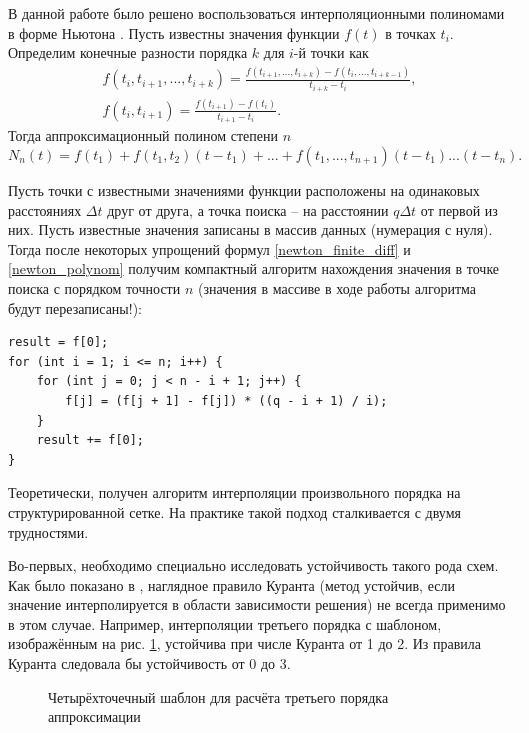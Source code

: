 В данной работе было решено воспользоваться интерполяционными полиномами в форме Ньютона \cite{petrov_lobanov}. Пусть известны значения функции $f(t)$ в точках $t_i$.
Определим конечные разности порядка $k$ для $i$-й точки как 
\begin{eqnarray}
\label{newton_finite_diff}
f(t_i, t_{i+1}, ..., t_{i+k}) = \frac{f(t_{i+1}, ..., t_{i+k}) - f(t_i, ..., t_{i+k-1})}{t_{i+k} - t_{i}}, \\
f(t_i, t_{i+1}) = \frac{f(t_{i+1}) - f(t_i)}{t_{i+1} - t_i}.
\end{eqnarray}
Тогда аппроксимационный полином степени $n$
\begin{equation}
\label{newton_polynom}
N_n(t) = f(t_1) + f(t_1, t_2)(t-t_1) + ... + f(t_1, ..., t_{n+1})(t-t_1)...(t-t_n).
\end{equation}

Пусть точки с известными значениями функции расположены на одинаковых расстояниях $\Delta t$ друг от друга, а точка поиска -- на расстоянии $q \Delta t$ от первой из них. Пусть известные значения записаны в массив данных (нумерация с нуля). Тогда после некоторых упрощений формул \eqref{newton_finite_diff} и \eqref{newton_polynom} получим компактный алгоритм нахождения значения в точке поиска с порядком точности $n$ (значения в массиве в ходе работы алгоритма будут перезаписаны!):


\begin{lstlisting}
result = f[0];
for (int i = 1; i <= n; i++) {
	for (int j = 0; j < n - i + 1; j++) {
		f[j] = (f[j + 1] - f[j]) * ((q - i + 1) / i);
	}
	result += f[0];
}
\end{lstlisting}
Теоретически, получен алгоритм интерполяции произвольного порядка на структурированной сетке. На практике такой подход сталкивается с двумя трудностями. 

Во-первых, необходимо специально исследовать устойчивость такого рода схем. Как было показано в \cite{favorskaya_disser}, наглядное правило Куранта (метод устойчив, если значение интерполируется в области зависимости решения) не всегда применимо в этом случае. Например, интерполяции третьего порядка с шаблоном, изображённым на рис. \ref{pic:stability}, устойчива при числе Куранта от 1 до 2. Из правила Куранта следовала бы устойчивость от 0 до 3.

\begin{figure}[H]
	\caption{Четырёхточечный шаблон для расчёта третьего порядка аппроксимации \cite{favorskaya_disser}}
	\label{pic:stability}
\end{figure}

